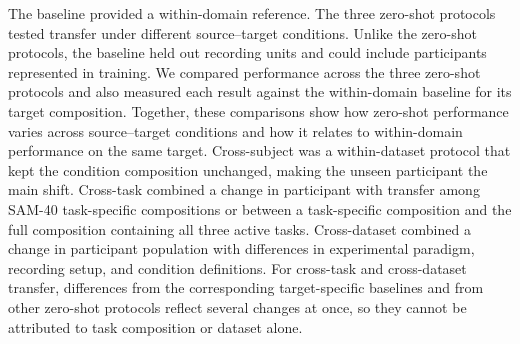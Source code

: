 \documentclass[10pt,letterpaper]{article}
\newcommand{\rev}[1]{#1}
\begin{document}
\rev{The baseline provided a within-domain reference. The three zero-shot protocols tested transfer under different source--target conditions. Unlike the zero-shot protocols, the baseline held out recording units and could include participants represented in training. We compared performance across the three zero-shot protocols and also measured each result against the within-domain baseline for its target composition. Together, these comparisons show how zero-shot performance varies across source--target conditions and how it relates to within-domain performance on the same target. Cross-subject was a within-dataset protocol that kept the condition composition unchanged, making the unseen participant the main shift. Cross-task combined a change in participant with transfer among SAM-40 task-specific compositions or between a task-specific composition and the full composition containing all three active tasks. Cross-dataset combined a change in participant population with differences in experimental paradigm, recording setup, and condition definitions. For cross-task and cross-dataset transfer, differences from the corresponding target-specific baselines and from other zero-shot protocols reflect several changes at once, so they cannot be attributed to task composition or dataset alone.}
\end{document}
